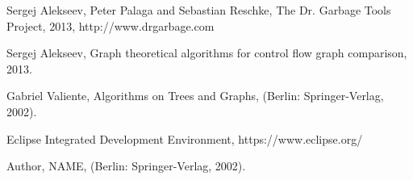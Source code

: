 \label{cha:references} 
\begin{thebibliography}{1}

  Sergej Alekseev, Peter Palaga and Sebastian Reschke, The Dr. Garbage Tools Project, 2013,
http://www.drgarbage.com

  Sergej Alekseev, Graph theoretical algorithms for control flow graph comparison, 2013.
 
 
 Gabriel Valiente, Algorithms on Trees and Graphs,
(Berlin: Springer-Verlag, 2002).


 Eclipse Integrated Development Environment, https://www.eclipse.org/

 Author, NAME,
(Berlin: Springer-Verlag, 2002).


 \end{thebibliography}
  